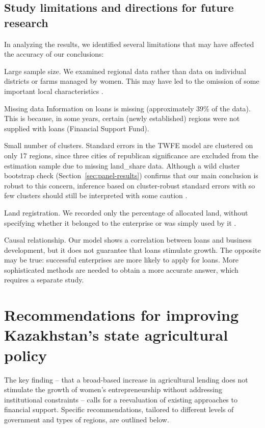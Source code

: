 ﻿\documentclass[pdflatex,sn-mathphys-ay]{sn-jnl}
\newif\ifrevmarks
\newcommand{\rev}[1]{\ifrevmarks\textcolor{red}{#1}\else#1\fi}
\begin{document}
\subsection{Study limitations and directions for future research}

In analyzing the results, we identified several limitations that may
have affected the accuracy of our conclusions:

Large sample size. We examined regional data rather than data on
individual districts or farms managed by women. This may have led to the
omission of some important local characteristics \citep{ref36}.

Missing data Information on loans is missing (approximately 39\% of the
data). This is because, in some years, certain (newly established)
regions were not supplied with loans (Financial Support Fund).

\rev{Small number of clusters. Standard errors in the TWFE model are
clustered on only 17 regions, since three cities of republican
significance are excluded from the estimation sample due to missing
land\_share data. Although a wild cluster bootstrap check
(Section~\ref{sec:panel-results}) confirms that our main conclusion is
robust to this concern, inference based on cluster-robust standard
errors with so few clusters should still be interpreted with some
caution \citep{ref107}.}

Land registration. We recorded only the percentage of allocated land,
without specifying whether it belonged to the enterprise or was simply
used by it \citep{ref52}.

Causal relationship. Our model shows a correlation between loans and
business development, but it does not guarantee that loans stimulate
growth. The opposite may be true: successful enterprises are more likely
to apply for loans. More sophisticated methods are needed to obtain a
more accurate answer, which requires a separate study.

\section{Recommendations for improving Kazakhstan's state agricultural policy}

The key finding -- that a broad-based increase in agricultural lending
does not stimulate the growth of women's entrepreneurship without
addressing institutional constraints -- calls for a reevaluation of
existing approaches to financial support. Specific recommendations,
tailored to different levels of government and types of regions, are
outlined below.
\end{document}
